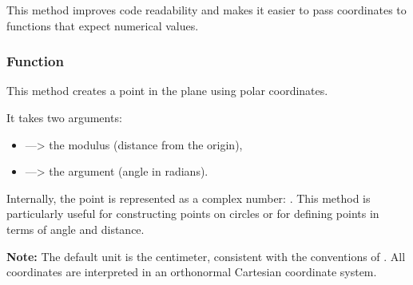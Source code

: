 This method improves code readability and makes it easier to pass coordinates to functions that expect numerical values.

\vspace{1em}

\begin{minipage}{.5\textwidth-1cm}
\end{minipage}
\begin{minipage}{.5\textwidth}
\begin{tkzexample}
\end{tkzexample}
\end{minipage}

\subsubsection{Function }
\label{ssub:method_point_polar}

This method creates a point in the plane using polar coordinates.

\medskip

It takes two arguments:
\begin{itemize}
  \item {} —> the modulus (distance from the origin),
  \item {} —> the argument (angle in radians).
\end{itemize}


Internally, the point is represented as a complex number: . This method is particularly useful for constructing points on circles or for defining points in terms of angle and distance.

\medskip

\textbf{Note:} The default unit is the centimeter, consistent with the conventions of . All coordinates are interpreted in an orthonormal Cartesian coordinate system.

